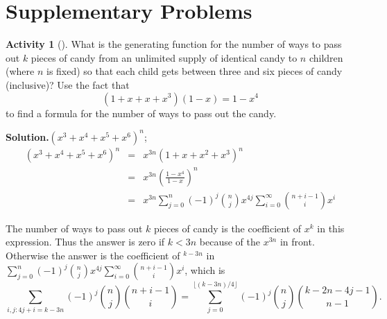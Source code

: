 \documentclass[10pt,]{book}
\theoremstyle{plain}
\theoremstyle{definition}
\newtheorem{activity}[project]{Activity}
\numberwithin{equation}{chapter}
\newcommand{\lt}{<}
\newcommand{\amp}{&}
\begin{document}
\section[{Supplementary Problems}]{Supplementary Problems}\label{sec_genfns-suppprobs}
\begin{activity}[]\label{candy-genfn}
What is the generating function for the number of ways to pass out \(k\) pieces of candy from an unlimited supply of identical candy to \(n\) children (where \(n\) is fixed) so that each child gets between three and six pieces of candy (inclusive)? Use the fact that%
\begin{equation*}
(1+x+x+x^3)(1-x) = 1-x^4
\end{equation*}
to find a formula for the number of ways to pass out the candy.%
\par\medskip\noindent%
\textbf{Solution.}\quad \((x^3+x^4+x^5+x^6)^n\);%
\begin{align*}
(x^3+x^4+x^5+x^6)^n\amp =\amp x^{3n}(1+x+x^2+x^3)^n\\
\amp =\amp x^{3n}\left(\frac{1-x^4}{1-x}\right)^n\\
\amp =\amp x^{3n}\sum_{j=0}^n (-1)^j\binom{n}{j}x^{4j}\sum_{i=0}^\infty
\binom{n+i-1}{i}x^i
\end{align*}
%
\par
The number of ways to pass out \(k\) pieces of candy is the coefficient of \(x^k\) in this expression. Thus the answer is zero if \(k\lt 3n\) because of the \(x^{3n}\) in front. Otherwise the answer is the coefficient of \(^{k-3n}\) in \(\sum_{j=0}^n (-1)^j\binom{n}{j}x^{4j}\sum_{i=0}^\infty \binom{n+i-1}{i}x^i\), which is%
\begin{equation*}
\sum_{i,j:4j+i=k-3n}(-1)^j\binom{n}{j}\binom{n+i-1}{i}= \sum_{j=0}^{\lfloor (k-3n)/4\rfloor} (-1)^j\binom{n}{j}\binom{k-2n-4j-1}{n-1}.
\end{equation*}
%
\end{activity}
\end{document}
